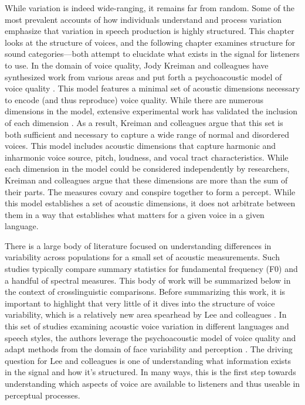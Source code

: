While variation is indeed wide-ranging, it remains far from random. Some of the most prevalent accounts of how individuals understand and process variation emphasize that variation in speech production is highly structured. This chapter looks at the structure of voices, and the following chapter examines structure for sound categories---both attempt to elucidate what exists in the signal for listeners to use.  In the domain of voice quality, Jody Kreiman and colleagues have synthesized work from various areas and put forth a psychoacoustic model of voice quality \citep{kreiman_2014_theory}. This model features a minimal set of acoustic dimensions necessary to encode (and thus reproduce) voice quality. While there are numerous dimensions in the model, extensive experimental work has validated the inclusion of each dimension \citep[][and references therein]{kreiman_2021_validating}. As a result, Kreiman and colleagues argue that this set is both sufficient and necessary to capture a wide range of normal and disordered voices. This model includes acoustic dimensions that capture harmonic and inharmonic voice source, pitch, loudness, and vocal tract characteristics. While each dimension in the model could be considered independently by researchers, Kreiman and colleagues argue that these dimensions are more than the sum of their parts. The measures covary and conspire together to form a percept. While this model establishes a set of acoustic dimensions, it does not arbitrate between them in a way that establishes what matters for a given voice in a given language. 

There is a large body of literature focused on understanding differences in variability across populations for a small set of acoustic measurements. Such studies typically compare summary statistics for fundamental frequency (F0) and a handful of spectral measures. This body of work will be summarized below in the context of crosslinguistic comparisons. Before summarizing this work, it is important to highlight that very little of it dives into the structure of voice variability, which is a relatively new area spearhead by Lee and colleagues \citep{lee_2019_acoustic, lee_2019_spontaneous, lee_2020_language}. In this set of studies examining acoustic voice variation in different languages and speech styles, the authors leverage the psychoacoustic model of voice quality \citep{kreiman_2014_theory} and adapt methods from the domain of face variability and perception \citep{burton_2016_faces}. The driving question for Lee and colleagues is one of understanding what information exists in the signal and how it's structured. In many ways, this is the first step towards understanding which aspects of voice are available to listeners and thus useable in perceptual processes.

